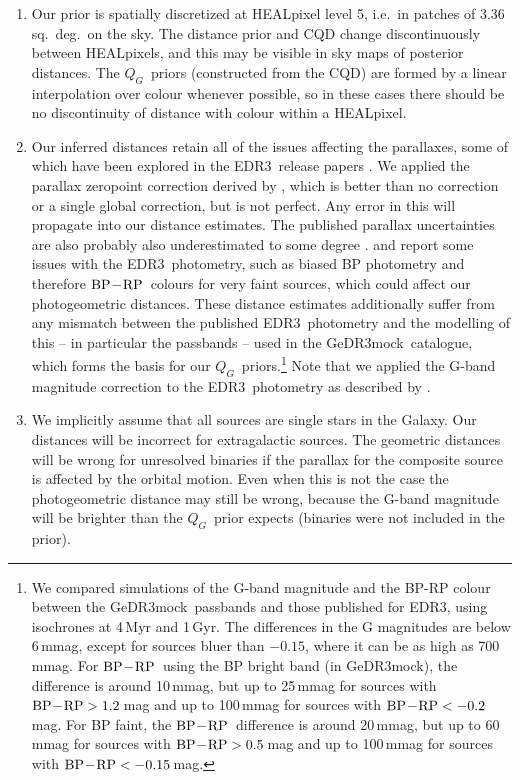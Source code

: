 \documentclass[twocolumn]{aastex62}
\providecommand{\mock}{GeDR3mock}
\providecommand{\release}{EDR3}
\providecommand{\QG}{\ensuremath{Q_G}}
\providecommand{\bprp}{\ensuremath{{\rm BP} \! - \! {\rm RP}}}
\begin{document}
\begin{enumerate}
\item Our prior is spatially discretized at HEALpixel level 5, i.e.\ in patches of 3.36\,sq.~deg.\ on the sky. The distance prior and CQD change discontinuously between HEALpixels, and this may be visible in sky maps of posterior distances.  The \QG\ priors (constructed from the CQD) are formed by a linear interpolation over colour whenever possible, so in these cases there should be no discontinuity of distance with colour within a HEALpixel.

\item Our inferred distances retain all of the issues affecting the parallaxes, some of which have been explored in the \release\ release papers \citep{lindegren_etal_gedr3_astrometry, fabricius_etal_gedr3_validation}.
We applied the parallax zeropoint correction derived by \cite{lindegren_etal_gedr3_parallaxzp}, which is better than no correction or a single global correction, but is not perfect. Any error in this will propagate into our distance estimates.
The published parallax uncertainties are also probably also underestimated to some degree \citep{fabricius_etal_gedr3_validation}.
\cite{gedr3_release} and \cite{riello_etal_gedr3_photometry}
report some issues with the \release\ photometry, 
such as biased BP photometry and therefore \bprp\ colours for very faint sources,
which could affect our photogeometric distances.
These distance estimates additionally suffer
from any mismatch between the published \release\ photometry and the modelling of this 
-- in particular the passbands -- used in the \mock\ catalogue, which forms the basis for our \QG\ priors.\footnote{We compared 
simulations of the G-band magnitude and the BP-RP colour
between the \mock\ passbands and those published for \release,
using isochrones at 4\,Myr and 1\,Gyr.
The differences in the G magnitudes are below 6\,mmag, except for sources bluer than $-0.15$, where it can be as high as 700\,mmag. For \bprp\ using the BP bright band (in \mock), the difference is around 10\,mmag, but up to 25\,mmag for sources with $\bprp > 1.2$\,mag and up to 100\,mmag for sources with $\bprp < -0.2$\,mag. For BP faint, the \bprp\ difference is around 20\,mmag, but up to 60\,mmag
for sources with $\bprp > 0.5$\,mag and up to 100\,mmag for sources with $\bprp < -0.15$\,mag.}
Note that we applied the G-band magnitude correction to the \release\ photometry as described by \cite{riello_etal_gedr3_photometry}.

\item We implicitly assume that all sources are single stars in the Galaxy. 
Our distances will be incorrect for extragalactic sources. The geometric distances will be wrong for unresolved binaries if the parallax for the composite source is affected by the orbital motion. Even when this is not the case the photogeometric distance may still be wrong, because the G-band magnitude will be brighter than the \QG\ prior expects (binaries were not included in the prior).


\end{enumerate}
\end{document}
